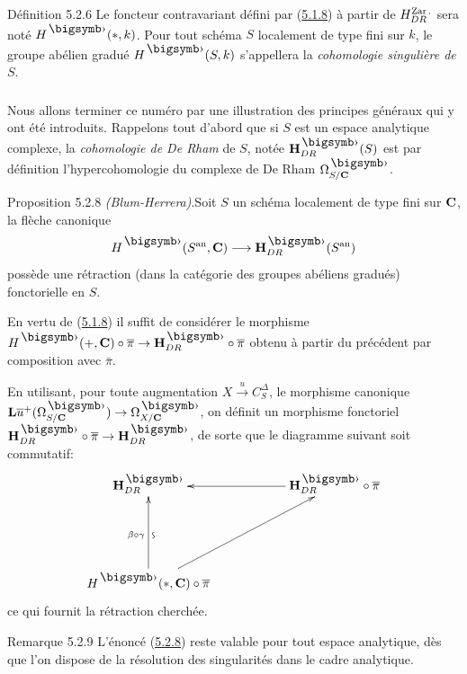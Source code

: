 \documentclass[10pt]{../fichiers-configuration-latex/smfart}
\begin{document}
\begin{enonce*}{Définition 5.2.6}
Le foncteur contravariant défini par (\hyperref[Vbis.prop5.1.8]{5.1.8}) à partir de
$H^{\operatorname{Zar}.}_{DR}$ sera noté $H^{\bigdot} (\ast, k)$. Pour tout schéma $S$
localement de type fini sur $k$, le groupe abélien gradué
$H^{\bigdot}(S, k)$ s'appellera la \emph{cohomologie singulière de} $S$.
\end{enonce*}

\setcounter{subsubsection}{6}
\subsubsection{}
Nous allons terminer ce numéro par une illustration des principes
généraux qui y ont été introduits. Rappelons tout d'abord que si $S$
est un espace analytique complexe, la \emph{cohomologie de De Rham} de
$S$, notée $\HH^{\bigdot}_{DR}(S)$ est par définition
l'hypercohomologie du complexe de De Rham $\Omega^{\bigdot}_{S /
  \CC}$.

\begin{enonce*}{Proposition 5.2.8}
\emph{(Blum-Herrera)}.\pageoriginale Soit $S$ un schéma localement de type fini sur
  $\mathbf{C}$, la flèche canonique
$$
H^{\bigdot} (S^{\an}, \CC) \longrightarrow
\HH^{\bigdot}_{DR}(S^{\an})
$$
possède une rétraction (dans la catégorie des groupes abéliens
gradués) fonctorielle en $S$.
\end{enonce*}

En vertu de (\hyperref[Vbis.prop5.1.8]{5.1.8}) il suffit de considérer le morphisme $H^{\bigdot}(+,
\CC) \circ \bar{\pi} \to \HH^{\bigdot}_{DR} \circ
\bar{\pi}$ obtenu à partir du précédent par composition avec
$\bar{\pi}$.

En utilisant, pour toute augmentation $X \xrightarrow{u}
C^{\Delta}_S$, le morphisme canonique
$\LL \bar{u}^{+}(\Omega^{\bigdot}_{S/\CC}) \to \Omega^{\bigdot}_{X/\CC}$, on
définit un morphisme fonctoriel $\HH^{\bigdot}_{DR} \circ \bar{\pi}
\to \HH^{\bigdot}_{DR}$, de sorte que le diagramme suivant soit
commutatif:
\[
\xymatrix@=2cm{
\HH^{\bigdot}_{DR}  & \HH^{\bigdot}_{DR} \circ \bar{\pi} \ar[l]\\
H^{\bigdot}(\ast,\CC)\circ\bar{\pi}
\ar[u]_{\text{\rotatebox{90}{$\backsim$}}}^{\beta \circ \gamma}
\ar[ru]&
}
\]
ce qui fournit la rétraction cherchée.

\begin{enonce*}[remark]{Remarque 5.2.9}
L'énoncé (\hyperref[Vbis.prop5.2.8]{5.2.8}) reste valable pour tout espace analytique, dès que
l'on dispose de la résolution des singularités dans le cadre analytique.
\end{enonce*}
\end{document}
